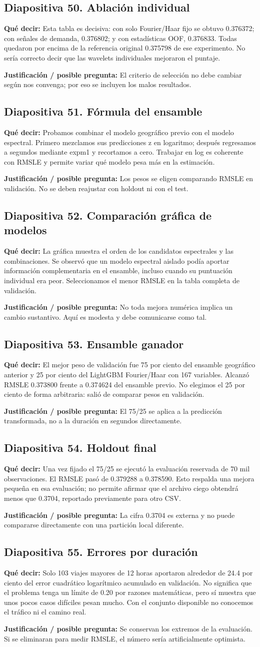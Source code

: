 \documentclass[11pt,letterpaper]{article}
\newcommand{\lamina}[2]{\subsection*{Diapositiva #1. #2}}
\newcommand{\explica}[1]{\noindent\textcolor{azul}{\textbf{Qué decir:}} #1\par\smallskip}
\newcommand{\defiende}[1]{\noindent\textcolor{verde}{\textbf{Justificación / posible pregunta:}} #1\par\medskip}
\begin{document}
\lamina{50}{Ablación individual}
\explica{Esta tabla es decisiva: con solo Fourier/Haar fijo se obtuvo 0.376372; con señales de demanda, 0.376802; y con estadísticas OOF, 0.376833. Todas quedaron por encima de la referencia original 0.375798 de ese experimento. No sería correcto decir que las wavelets individuales mejoraron el puntaje.}
\defiende{El criterio de selección no debe cambiar según nos convenga; por eso se incluyen los malos resultados.}

\lamina{51}{Fórmula del ensamble}
\explica{Probamos combinar el modelo geográfico previo con el modelo espectral. Primero mezclamos sus predicciones z en logaritmo; después regresamos a segundos mediante expm1 y recortamos a cero. Trabajar en log es coherente con RMSLE y permite variar qué modelo pesa más en la estimación.}
\defiende{Los pesos se eligen comparando RMSLE en validación. No se deben reajustar con holdout ni con el test.}

\lamina{52}{Comparación gráfica de modelos}
\explica{La gráfica muestra el orden de los candidatos espectrales y las combinaciones. Se observó que un modelo espectral aislado podía aportar información complementaria en el ensamble, incluso cuando su puntuación individual era peor. Seleccionamos el menor RMSLE en la tabla completa de validación.}
\defiende{No toda mejora numérica implica un cambio sustantivo. Aquí es modesta y debe comunicarse como tal.}

\lamina{53}{Ensamble ganador}
\explica{El mejor peso de validación fue 75 por ciento del ensamble geográfico anterior y 25 por ciento del LightGBM Fourier/Haar con 167 variables. Alcanzó RMSLE 0.373800 frente a 0.374624 del ensamble previo. No elegimos el 25 por ciento de forma arbitraria: salió de comparar pesos en validación.}
\defiende{El 75/25 se aplica a la predicción transformada, no a la duración en segundos directamente.}

\lamina{54}{Holdout final}
\explica{Una vez fijado el 75/25 se ejecutó la evaluación reservada de 70 mil observaciones. El RMSLE pasó de 0.379288 a 0.378590. Esto respalda una mejora pequeña en esa evaluación; no permite afirmar que el archivo ciego obtendrá menos que 0.3704, reportado previamente para otro CSV.}
\defiende{La cifra 0.3704 es externa y no puede compararse directamente con una partición local diferente.}

\lamina{55}{Errores por duración}
\explica{Solo 103 viajes mayores de 12 horas aportaron alrededor de 24.4 por ciento del error cuadrático logarítmico acumulado en validación. No significa que el problema tenga un límite de 0.20 por razones matemáticas, pero sí muestra que unos pocos casos difíciles pesan mucho. Con el conjunto disponible no conocemos el tráfico ni el camino real.}
\defiende{Se conservan los extremos de la evaluación. Si se eliminaran para medir RMSLE, el número sería artificialmente optimista.}
\end{document}
